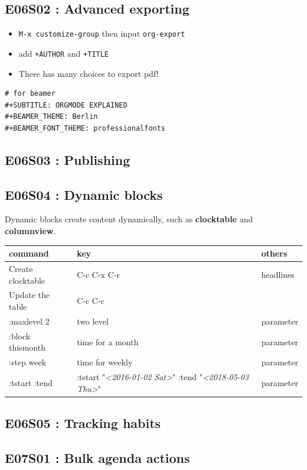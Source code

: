 \documentclass[11pt]{article}
\begin{document}
\subsection{E06S02 : Advanced exporting}
\label{sec:org22bbc22}
\begin{itemize}
\item \texttt{M-x customize-group} then input  \texttt{org-export}
\item add \texttt{+AUTHOR} and \texttt{+TITLE}
\item There has many choices to export pdf!
\end{itemize}

\begin{verbatim}
# for beamer
#+SUBTITLE: ORGMODE EXPLAINED
#+BEAMER_THEME: Berlin
#+BEAMER_FONT_THEME: professionalfonts
\end{verbatim}

\subsection{E06S03 : Publishing}
\label{sec:org9a40c6a}
\subsection{E06S04 : Dynamic blocks}
\label{sec:org93f8baa}
Dynamic blocks create content dynamically, such as \textbf{clocktable} and
\textbf{columnview}. 

\begin{center}
\begin{tabular}{lll}
command & key & others\\
\hline
Create clocktable &  C-c C-x C-r  & headlines\\
Update the table &  C-c C-c  & \\
:maxlevel 2 & two level & parameter\\
:block thismonth & time for a month & parameter\\
:step week & time for weekly & parameter\\
:tstart :tend & :tstart "\textit{<2016-01-02 Sat>}" :tend "\textit{<2018-05-03 Thu>}" & parameter\\
\end{tabular}
\end{center}

\subsection{E06S05 : Tracking habits}
\label{sec:org2e14601}
\subsection{E07S01 : Bulk agenda actions}
\label{sec:org74d677b}
\end{document}
